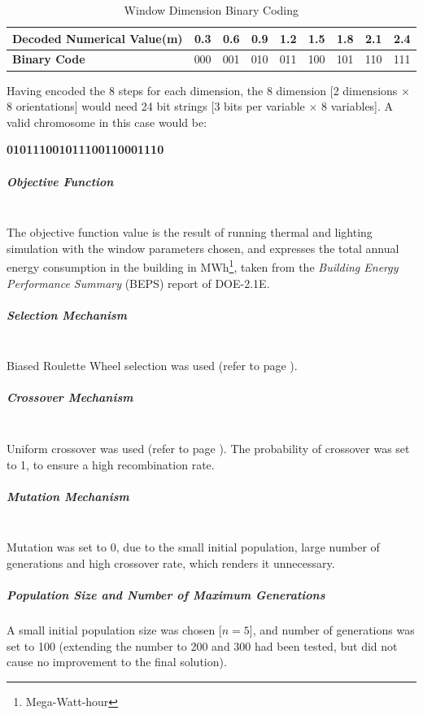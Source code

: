 \begin{table}[h]
\centering
\begin{tabular}{l|rrrrrrrr}
\textbf{Decoded Numerical Value(m)}&0.3&0.6&0.9&1.2&1.5&1.8&2.1&2.4\\ \hline
\textbf{Binary Code}&000&001&010&011&100&101&110&111\\
\end{tabular}
\caption{Window Dimension Binary Coding}
\label{table:WinDimCode}
\end{table}

Having encoded the 8 steps for each dimension, the 8 dimension [2 dimensions $\times$ 8 orientations] would need 24 bit strings [3 bits per variable $\times$ 8 variables]. A valid chromosome in this case would be:\\
\vspace{0.3cm}
\begin{center}
\textbf{010111001011100110001110}
\end{center}

\subparagraph{Objective Function}\mbox{}\\

The objective function value is the result of running thermal and lighting simulation with the window parameters chosen, and expresses the total annual energy consumption in the building in MWh\footnote{Mega-Watt-hour}, taken from the \emph{Building Energy Performance Summary} (BEPS) report of DOE-2.1E.

\subparagraph{Selection Mechanism}\mbox{}\\

Biased Roulette Wheel selection was used (refer to page \pageref{eqn:BiasedRoulette}).

\subparagraph{Crossover Mechanism}\mbox{}\\

Uniform crossover was used (refer to page \pageref{eqn:UniformCross}). The probability of crossover was set to 1, to ensure a high recombination rate.

\subparagraph{Mutation Mechanism}\mbox{}\\

Mutation was set to 0, due to the small initial population, large number of generations and high crossover rate, which renders it unnecessary.

\subparagraph{Population Size and Number of Maximum Generations}

A small initial population size was chosen [$n=5$], and number of generations was set to 100 (extending the number to 200 and 300 had been tested, but did not cause no improvement to the final solution).

